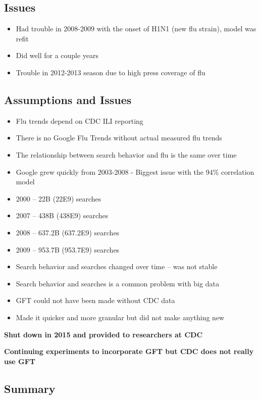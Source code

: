 \documentclass[
]{book}
\providecommand{\tightlist}{%
  \setlength{\itemsep}{0pt}\setlength{\parskip}{0pt}}
\begin{document}
\subsection{Issues}\label{issues}

\begin{itemize}
\tightlist
\item
  Had trouble in 2008-2009 with the onset of H1N1 (new flu strain), model was refit
\item
  Did well for a couple years
\item
  Trouble in 2012-2013 season due to high press coverage of flu
\end{itemize}

\subsection{Assumptions and Issues}\label{assumptions-and-issues}

\begin{itemize}
\tightlist
\item
  Flu trends depend on CDC ILI reporting
\item
  There is no Google Flu Trends without actual measured flu trends
\item
  The relationship between search behavior and flu is the same over time
\item
  Google grew quickly from 2003-2008 - Biggest issue with the 94\% correlation model
\item
  2000 -- 22B (22E9) searches
\item
  2007 -- 438B (438E9) searches
\item
  2008 -- 637.2B (637.2E9) searches
\item
  2009 -- 953.7B (953.7E9) searches
\item
  Search behavior and searches changed over time -- was not stable
\item
  Search behavior and searches is a common problem with big data
\item
  GFT could not have been made without CDC data
\item
  Made it quicker and more granular but did not make anything new
\end{itemize}

\textbf{Shut down in 2015 and provided to researchers at CDC}

\textbf{Continuing experiments to incorporate GFT but CDC does not really use GFT}

\subsection{Summary}\label{summary}
\end{document}

